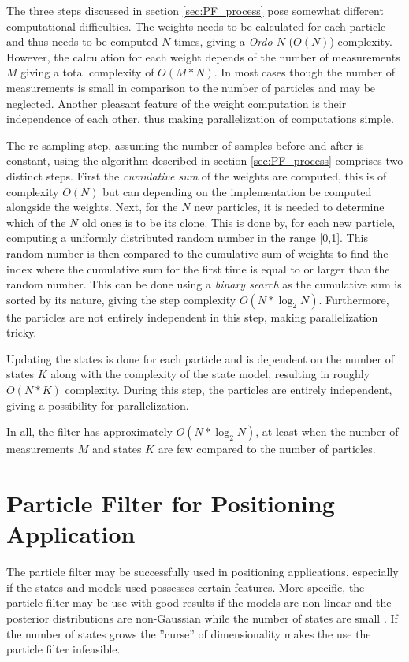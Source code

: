 \documentclass{LTHthesis}
\begin{document}
The three steps discussed in section \ref{sec:PF_process} pose somewhat different computational difficulties. The weights needs to be calculated for each particle and thus needs to be computed $N$ times, giving a \emph{Ordo $N$} ($O(N)$) complexity. However, the calculation for each weight depends of the number of measurements $M$ giving a total complexity of $O(M*N)$. In most cases though the number of measurements is small in comparison to the number of particles and may be neglected. Another pleasant feature of the weight computation is their independence of each other, thus making parallelization of computations simple.

The re-sampling step, assuming the number of samples before and after is constant, using the algorithm described in section \ref{sec:PF_process} comprises two distinct steps. First the \emph{cumulative sum} of the weights are computed, this is of complexity $O(N)$ but can depending on the implementation be computed alongside the weights. Next, for the $N$ new particles, it is needed to determine which of the $N$ old ones is to be its clone. This is done by, for each new particle, computing a uniformly distributed random number in the range [0,1]. This random number is then compared to the cumulative sum of weights to find the index where the cumulative sum for the first time is equal to or larger than the random number. This can be done using a \emph{binary search} as the cumulative sum is sorted by its nature, giving the step complexity $O(N*\log_2{N})$. Furthermore, the particles are not entirely independent in this step, making parallelization tricky.

Updating the states is done for each particle and is dependent on the number of states $K$ along with the complexity of the state model, resulting in roughly $O(N*K)$ complexity. During this step, the particles are entirely independent, giving a possibility for parallelization.   

In all, the filter has approximately $O(N*\log_2{N})$, at least when the number of measurements $M$ and states $K$ are few compared to the number of particles.       
%
\section{Particle Filter for Positioning Application}
%
The particle filter may be successfully used in positioning applications, especially if the states and models used possesses certain features. More specific, the particle filter may be use with good results if the models are non-linear and the posterior distributions are non-Gaussian while the number of states are small \cite{gson12}. If the number of states grows the ''curse'' of dimensionality makes the use the particle filter infeasible.
\end{document}
